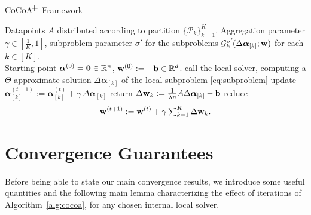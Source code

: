 \documentclass{article}
\newcommand{\cocoap}{\textsc{CoCoA$\!^{\bf \textbf{\footnotesize+}}$}\xspace}
\newcommand{\R}{\mathbb{R}}                      %
\newcommand{\wv}{ {\bf w}}
\newcommand{\alphav}{ {\boldsymbol \alpha}}
\newcommand{\bv}{ {\bf b}}
\newcommand{\0}{ {\bf 0}}
\newcommand{\vsubset}[2]{#1_{[#2]}}
\newcommand{\vc}[2]{#1^{(#2)}}                   %
\newcommand{\Ggk}{\mathcal{G}^{\sigma'}_k\hspace{-0.08em}}
\theoremstyle{plain}
\theoremstyle{definition}
\begin{document}
\begin{algorithm}[h]
\caption{\cocoap Framework}
\label{alg:cocoa}

\begin{algorithmic}[1]
 Datapoints $A$ distributed according to partition $\{\mathcal{P}_k\}_{k=1}^K$.
Aggregation parameter $\gamma\!\in\![\frac1K,1]$, 
subproblem parameter $\sigma'$ for the subproblems
$\Ggk(  \vsubset{\Delta \alphav}{k}; \wv)$ for each $k\in[K]$.\\
Starting point $\vc{\alphav}{0} = \0 \in \R^n$, $\vc{\wv}{0}:=-\bv\in \R^d$.
     \STATE call the local solver, computing
     a $\Theta$-approximate solution 
     $\vsubset{\Delta \alphav}{k}$   
        of  the local subproblem \eqref{eq:subproblem} 
     \STATE update $\vsubset{\vc{\alphav}{t+1}}{k} := \vsubset{\vc{\alphav}{t}}{k} + \gamma \, \vsubset{\Delta \alphav}{k}$
     \STATE return $\Delta \wv_k :=\frac1{\lambda n} A \vsubset{\Delta \alphav}{k} - \bv$ %
  \ENDFOR
  \STATE reduce\vspace{-7mm}
\begin{equation}\label{eq:primalGlobalUpdate}\vspace{-2mm}
\vc{\wv}{t+1}  := \vc{\wv}{t} +
  \gamma \textstyle \sum_{k=1}^K \Delta \wv_k.
\end{equation}
  
  
\ENDFOR 
\end{algorithmic}
\end{algorithm}


\section{Convergence Guarantees}
\label{sec:convergence}

Before being able to state our main convergence results, we introduce some useful quantities and the following main lemma characterizing the effect of iterations of Algorithm~\ref{alg:cocoa}, for any chosen internal local solver.
\end{document}
